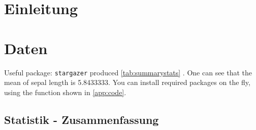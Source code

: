 \documentclass[a4paper,11pt,bibliography=totoc,numbers=noenddot]{scrartcl}\usepackage[]{graphicx}\usepackage[]{color}
\begin{document}






\newpage
\tableofcontents
\newpage
\listoftables
\newpage
\listoffigures



\newpage
{}
\section{Einleitung}
\label{sec:Introduction}
\blindtext


\newpage
\section{Daten}
\label{sec:Data}
\blindtext[1]

Useful package: \texttt{stargazer} produced \vref{tab:summarystats} \cite{stargazer}. One can see that the mean of sepal length is 5.8433333. You can install required packages on the fly, using the function shown in \vref{app:code}.
\subsection{Statistik - Zusammenfassung}
\label{sub:Stats}
\blindtext
\end{document}
